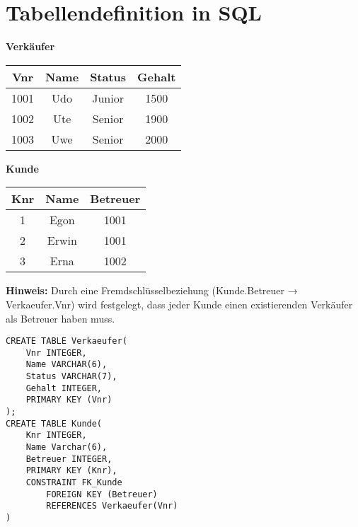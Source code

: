 
\section{Tabellendefinition in SQL}

\begin{table}[H]
    \centering
    \begin{minipage}{0.4\textwidth}
        \centering
        \textbf{Verkäufer} \\[3pt]
        \begin{tabular}{|c|c|c|c|}
            \hline
            \textbf{Vnr} & \textbf{Name} & \textbf{Status} & \textbf{Gehalt} \\
            \hline
            1001 & Udo & Junior & 1500 \\
            \hline
            1002 & Ute & Senior & 1900 \\
            \hline
            1003 & Uwe & Senior & 2000 \\
            \hline
        \end{tabular}
    \end{minipage}
    \hspace{0.9cm}
    \begin{minipage}{0.4\textwidth}
        \centering
        \textbf{Kunde} \\[3pt]
        \begin{tabular}{|c|c|c|}
            \hline
            \textbf{Knr} & \textbf{Name} & \textbf{Betreuer} \\
            \hline
            1 & Egon & 1001 \\
            \hline
            2 & Erwin & 1001 \\
            \hline
            3 & Erna & 1002 \\
            \hline
        \end{tabular}
    \end{minipage}
\end{table}

\textbf{Hinweis:} Durch eine Fremdschlüsselbeziehung (Kunde.Betreuer → Verkaeufer.Vnr) wird festgelegt, dass jeder Kunde einen existierenden Verkäufer als Betreuer haben muss.

\begin{lstlisting}[style=sqlstyle, caption={Tabellendefinition in SQL}]
CREATE TABLE Verkaeufer(
    Vnr INTEGER,
    Name VARCHAR(6),
    Status VARCHAR(7),
    Gehalt INTEGER,
    PRIMARY KEY (Vnr)
);
CREATE TABLE Kunde(
    Knr INTEGER,
    Name Varchar(6),
    Betreuer INTEGER,
    PRIMARY KEY (Knr),
    CONSTRAINT FK_Kunde
        FOREIGN KEY (Betreuer)
        REFERENCES Verkaeufer(Vnr)
)
\end{lstlisting}

